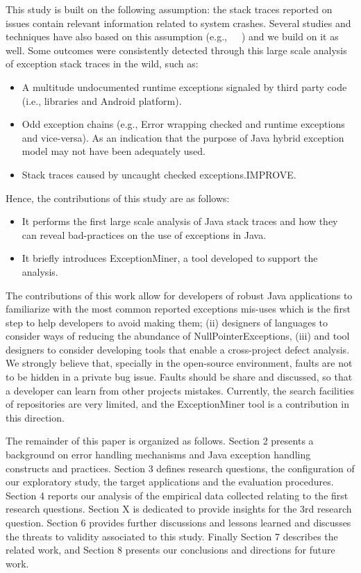 \documentclass[conference]{IEEEtran}
\begin{document}
This study is built on the following assumption: the stack traces reported on issues contain relevant information related to system crashes. Several studies and techniques have also based on this assumption (e.g.,~\cite{sinha2009fault}~\cite{dhaliwal2011classifying}~\cite{kim2013predicting}) and we build on it as well. Some outcomes were consistently detected through this large scale analysis of exception stack traces in the wild, such as:

\begin{itemize}
\item  A multitude undocumented runtime exceptions signaled by third party code (i.e., libraries and Android platform).
\item  Odd exception chains (e.g., Error wrapping checked and runtime exceptions and vice-versa). As an indication that the purpose of Java hybrid exception model may not have been adequately used.
\item  Stack traces caused by uncaught checked exceptions.IMPROVE.

\end{itemize}
 
Hence, the contributions of this study are as follows:
\begin{itemize}
\item  It performs the first large scale analysis of Java stack traces and how they can reveal bad-practices on the use of exceptions in Java. 
\item  It briefly introduces ExceptionMiner, a tool developed to support the analysis.
\end{itemize}


The contributions of this work allow for developers of robust Java applications to familiarize with the most common reported exceptions mis-uses which is the first step to help developers to avoid making them; (ii) designers of languages to consider ways of reducing the abundance of NullPointerExceptions, (iii) and tool designers to consider developing tools that enable a cross-project defect analysis. We strongly believe that, specially in the open-source environment, faults are not to be hidden in a private bug issue. Faults should be share and discussed, so that a developer can learn from other projects mistakes. Currently, the search facilities of repositories are very limited, and the ExceptionMiner tool is a contribution in this direction.

The remainder of this paper is organized as follows. Section 2 presents a background on error handling mechanisms and Java exception handling constructs and practices. Section 3 defines research questions, the configuration of our exploratory study, the target applications and the evaluation procedures. Section 4 reports our analysis of the empirical data collected relating to the first research questions. Section X is dedicated to provide insights for the 3rd research question. Section 6 provides further discussions and lessons learned and discusses the threats to validity associated to this study. Finally Section 7 describes the related work, and Section 8 presents our conclusions and directions for future work. 
\end{document}
